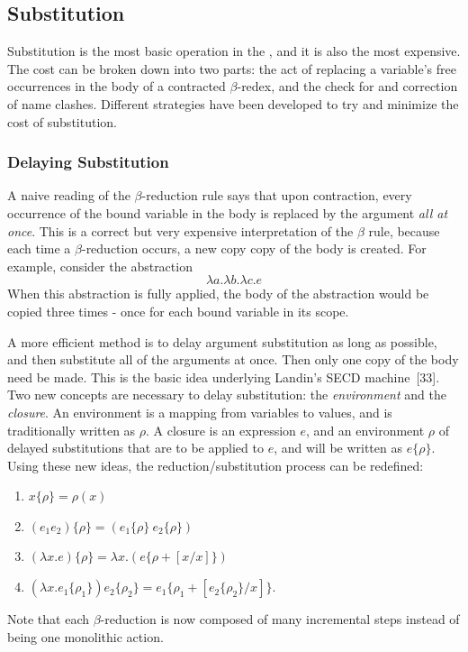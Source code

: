 \subsection{Substitution}

Substitution is the most basic operation in the \lambdacalculus, and it is also
the most expensive. The cost can be broken down into two parts: the act of
replacing a variable's free occurrences in the body of a contracted
\(\beta\)-redex, and the check for and correction of name clashes. Different
strategies have been developed to try and minimize the cost of substitution.

\subsubsection*{Delaying Substitution}

A naive reading of the \(\beta\)-reduction rule says that upon contraction,
every occurrence of the bound variable in the body is replaced by the argument
\emph{all at once}. This is a correct but very expensive interpretation of the
\(\beta\) rule, because each time a \(\beta\)-reduction occurs, a new copy copy
of the body is created. For example, consider the abstraction
\[
\lambda a.\lambda b.\lambda c.e
\]
When this abstraction is fully applied, the body of the abstraction would be
copied three times - once for each bound variable in its scope.

A more efficient method is to delay argument substitution as long as possible,
and then substitute all of the arguments at once. Then only one copy of the body
need be made. This is the basic idea underlying Landin's SECD machine~[33]. Two
new concepts are necessary to delay substitution: the \emph{environment} and the
\emph{closure}. An environment is a mapping from variables to values, and is
traditionally written as \(\rho\). A closure is an expression \(e\), and an
environment \(\rho\) of delayed substitutions that are to be applied to \(e\),
and will be written as \(e\{\rho\}\). Using these new ideas, the
reduction/substitution process can be redefined:
\begin{enumerate}[itemsep=0.4em]
\item \(x\{\rho\} = \rho(x)\)
\item \((e_1e_2)\{\rho\} = (e_1\{\rho\}\ e_2\{\rho\})\)
\item \((\lambda x.e)\{\rho\} = \lambda x.(e\{\rho + [x/x]\})\)
\item \((\lambda x.e_1\{\rho_1\})e_2\{\rho_2\}
   = e_1\{\rho_1 + [e_2\{\rho_2\}/x]\}\).
\end{enumerate}
Note that each \(\beta\)-reduction is now composed of many incremental steps
instead of being one monolithic action.

